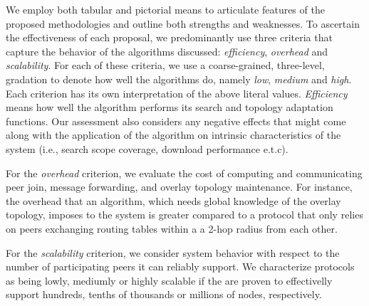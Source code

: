 We employ both tabular and pictorial means to 
articulate features of the proposed methodologies and outline
both strengths and weaknesses.
To ascertain the effectiveness of each proposal, we predominantly use 
three criteria that capture the behavior of the algorithms 
discussed:
\emph{efficiency}, \emph{overhead} and \emph{scalability}.
For each of these criteria, we use a coarse-grained,
three-level, gradation to denote how well the algorithms do,
namely \emph{low}, \emph{medium} and \emph{high}.
Each criterion has its own
interpretation of the above literal values. 
\emph{Efficiency} means how well the
algorithm performs its search and topology adaptation functions. Our assessment
also considers any negative effects that might come along with the application
of the algorithm on intrinsic characteristics of the system (i.e., search scope
coverage, download performance e.t.c).

For the \emph{overhead} criterion, we evaluate the cost
of computing and communicating peer join, message forwarding, 
and overlay topology maintenance. For instance, the overhead that an algorithm,
which needs global knowledge of the overlay topology, imposes to the system is
greater compared to a protocol that only relies on peers exchanging routing
tables within a a 2-hop radius from each other.

For the \emph{scalability} criterion, we consider system behavior with respect
to the number of participating peers it can reliably support. We characterize
protocols as being lowly, mediumly or highly scalable if the are proven to
effectivelly support hundreds, tenths of thousands or millions of nodes,
respectively.
